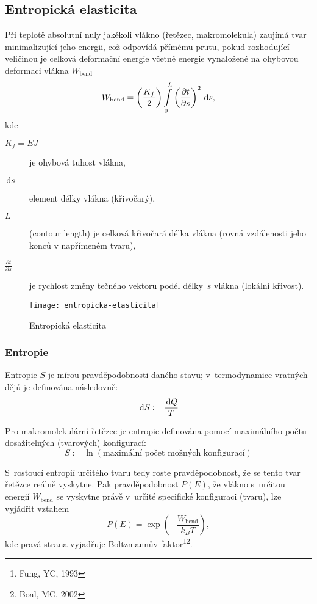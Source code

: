 
\subsection{Entropická elasticita}
Při teplotě absolutní nuly jakékoli vlákno (řetězec, makromolekula) zaujímá tvar minimalizující jeho energii, což odpovídá přímému prutu, pokud rozhodující veličinou je celková deformační energie včetně energie vynaložené na ohybovou deformaci vlákna $W_\text{bend}$
\begin{equation}
	W_\text{bend} = \left(\frac{K_f}{2}\right) \int\limits_0^L \left(\frac{\partial t}{\partial s}\right)^2 \,\mathrm{d} s,
\end{equation}
kde
\begin{description}
	\item[$K_f = EJ$] je ohybová tuhost vlákna,
	\item[$\,\mathrm{d} s$] element délky vlákna (křivočarý),
	\item[$L$] (contour length) je celková křivočará délka vlákna (rovná vzdálenosti jeho konců v napřímeném tvaru),
	\item[$\tfrac{\partial t}{\partial s}$] je rychlost změny tečného vektoru podél délky~$s$ vlákna (lokální křivost).
\end{description}

\begin{figure}[H]
	\centering
	\texttt{[image: entropicka-elasticita]}
	\caption{Entropická elasticita}
	\label{fig:entropicka-elasticita}
\end{figure}

\subsubsection{Entropie}
Entropie $S$ je mírou pravděpodobnosti daného stavu; v~termodynamice vratných dějů je definována následovně:
\begin{equation}
	\,\mathrm{d} S := \frac{\,\mathrm{d} Q}{T}
\end{equation}

Pro makromolekulární řetězec je entropie definována pomocí maximálního počtu dosažitelných (tvarových) konfigurací:
\begin{equation}
	S := \ln\left(\text{maximální počet možných konfigurací}\right)
\end{equation}

S~rostoucí entropií určitého tvaru tedy roste pravděpodobnost, že se tento tvar řetězce reálně vyskytne.
Pak pravděpodobnost $P(E)$, že vlákno s~určitou energií $W_\text{bend}$ se vyskytne právě v~určité specifické konfiguraci (tvaru), lze vyjádřit vztahem
\begin{equation}
	P(E) = \exp\left(-\frac{W_\text{bend}}{k_B T}\right),
\end{equation}
kde pravá strana vyjadřuje Boltzmannův faktor\footnote{Fung, YC, 1993}\footnote{Boal, MC, 2002}.

